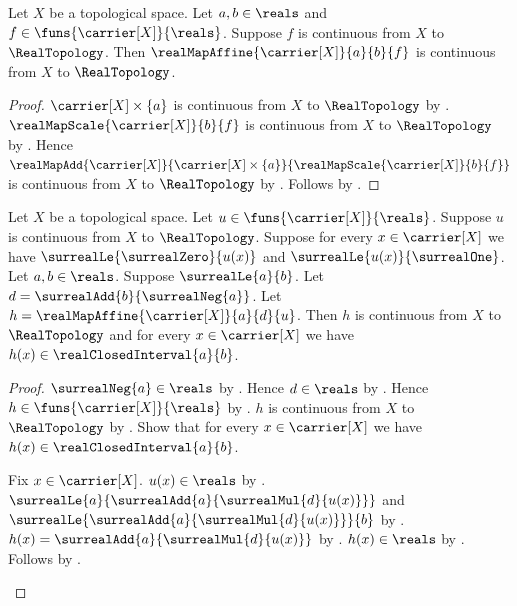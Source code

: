 \begin{theorem}\label{real_map_affine_continuous}
    Let $X$ be a topological space.
    Let $a,b\in\reals$ and $f\in\funs{\carrier[X]}{\reals}$.
    Suppose $f$ is continuous from $X$ to $\RealTopology$.
    Then $\realMapAffine{\carrier[X]}{a}{b}{f}$ is continuous from $X$
        to $\RealTopology$.
\end{theorem}
\begin{proof}
    $\carrier[X]\times\{a\}$ is continuous from $X$ to $\RealTopology$
        by .
    $\realMapScale{\carrier[X]}{b}{f}$ is continuous from $X$ to
        $\RealTopology$ by .
    Hence
        $\realMapAdd{\carrier[X]}{\carrier[X]\times\{a\}}
            {\realMapScale{\carrier[X]}{b}{f}}$
        is continuous from $X$ to $\RealTopology$
        by
        .
    Follows by .
\end{proof}

\begin{theorem}\label{real_affine_of_unit_range_continuous}
    Let $X$ be a topological space.
    Let $u\in\funs{\carrier[X]}{\reals}$.
    Suppose $u$ is continuous from $X$ to $\RealTopology$.
    Suppose for every $x\in\carrier[X]$ we have
        $\surrealLe{\surrealZero}{u(x)}$ and
        $\surrealLe{u(x)}{\surrealOne}$.
    Let $a,b\in\reals$.
    Suppose $\surrealLe{a}{b}$.
    Let $d=\surrealAdd{b}{\surrealNeg{a}}$.
    Let $h=\realMapAffine{\carrier[X]}{a}{d}{u}$.
    Then $h$ is continuous from $X$ to $\RealTopology$ and
        for every $x\in\carrier[X]$ we have
            $h(x)\in\realClosedInterval{a}{b}$.
\end{theorem}
\begin{proof}
    $\surrealNeg{a}\in\reals$ by .
    Hence $d\in\reals$ by .
    Hence $h\in\funs{\carrier[X]}{\reals}$
        by .
    $h$ is continuous from $X$ to $\RealTopology$
        by .
    Show that for every $x\in\carrier[X]$ we have
        $h(x)\in\realClosedInterval{a}{b}$.
    \begin{subproof}
        Fix $x\in\carrier[X]$.
        $u(x)\in\reals$ by .
        $\surrealLe{a}{\surrealAdd{a}{\surrealMul{d}{u(x)}}}$ and
            $\surrealLe{\surrealAdd{a}{\surrealMul{d}{u(x)}}}{b}$
            by .
        $h(x)=\surrealAdd{a}{\surrealMul{d}{u(x)}}$
            by .
        $h(x)\in\reals$ by .
        Follows by .
    \end{subproof}
\end{proof}
